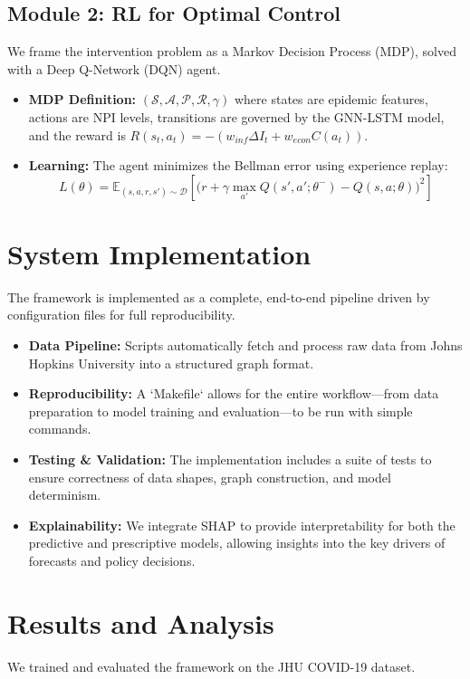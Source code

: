 \documentclass[10pt, a4paper, twocolumn]{article}
\begin{document}
\subsection{Module 2: RL for Optimal Control}
We frame the intervention problem as a Markov Decision Process (MDP), solved with a Deep Q-Network (DQN) agent.
\begin{itemize}
    \item \textbf{MDP Definition:} $(\mathcal{S},\mathcal{A},\mathcal{P},\mathcal{R},\gamma)$ where states are epidemic features, actions are NPI levels, transitions are governed by the GNN-LSTM model, and the reward is $R(s_t,a_t) = -(w_{inf}\Delta I_t + w_{econ}C(a_t))$.
    \item \textbf{Learning:} The agent minimizes the Bellman error using experience replay:
    \begin{equation}
    L(\theta) = \mathbb{E}_{(s,a,r,s')\sim\mathcal{D}}\!\left[\big(r+\gamma \max_{a'}Q(s',a';\theta^-)-Q(s,a;\theta)\big)^2\right]
    \end{equation}
\end{itemize}

\section{System Implementation}
The framework is implemented as a complete, end-to-end pipeline driven by configuration files for full reproducibility.
\begin{itemize}
    \item \textbf{Data Pipeline:} Scripts automatically fetch and process raw data from Johns Hopkins University into a structured graph format.
    \item \textbf{Reproducibility:} A `Makefile` allows for the entire workflow—from data preparation to model training and evaluation—to be run with simple commands.
    \item \textbf{Testing \& Validation:} The implementation includes a suite of tests to ensure correctness of data shapes, graph construction, and model determinism.
    \item \textbf{Explainability:} We integrate SHAP \cite{lundberg2017unified} to provide interpretability for both the predictive and prescriptive models, allowing insights into the key drivers of forecasts and policy decisions.
\end{itemize}

\section{Results and Analysis}
We trained and evaluated the framework on the JHU COVID-19 dataset.
\end{document}
